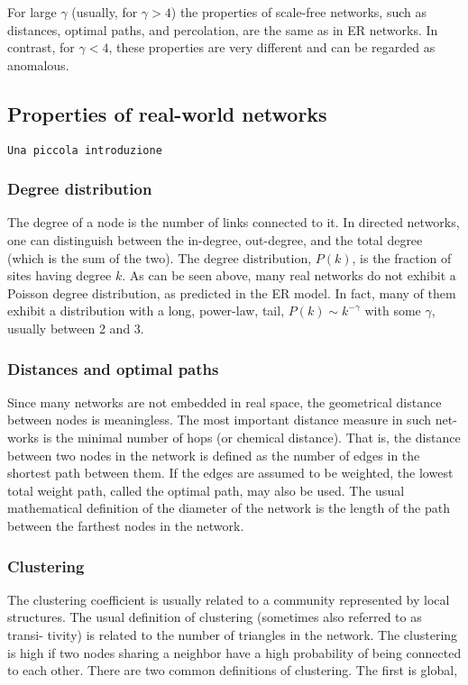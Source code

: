\documentclass[12pt]{article}
\newcommand{\nd}{\noindent}
\begin{document}
\nd For large $\gamma$ (usually, for $\gamma > 4$) the properties of scale-free networks, such as distances, optimal paths, and percolation, are the same as in ER networks. In contrast, for $\gamma < 4$, these properties are very different and can be regarded as anomalous.

\subsection{Properties of real-world networks}

\texttt{Una piccola introduzione}

\subsubsection{Degree distribution}

\nd The degree of a node is the number of links connected to it. In directed networks, one can distinguish between the in-degree, out-degree, and the total degree (which is the sum of the two). The degree distribution, $P(k)$, is the fraction of sites having degree $k$. As can be seen above, many real networks do not exhibit a Poisson degree
distribution, as predicted in the ER model. In fact, many of them exhibit a distribution with a long, power-law, tail, $P(k) \sim k^{-\gamma}$ with some $\gamma$, usually between 2 and 3.

\subsubsection{Distances and optimal paths}

\nd Since many networks are not embedded in real space, the geometrical distance
between nodes is meaningless. The most important distance measure in such net-
works is the minimal number of hops (or chemical distance). That is, the distance
between two nodes in the network is defined as the number of edges in the shortest
path between them. If the edges are assumed to be weighted, the lowest total weight
path, called the optimal path, may also be used. The usual mathematical definition
of the diameter of the network is the length of the path between the farthest nodes in
the network.

\subsubsection{Clustering}

\nd The clustering coefficient is usually related to a community represented by local
structures. The usual definition of clustering (sometimes also referred to as transi-
tivity) is related to the number of triangles in the network. The clustering is high
if two nodes sharing a neighbor have a high probability of being connected to each
other. There are two common definitions of clustering. The first is global,
\end{document}
